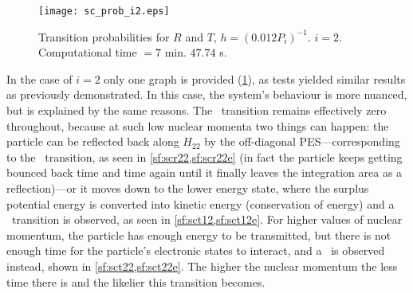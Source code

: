 \begin{figure}
\centering
\texttt{[image: sc\_prob\_i2.eps]}
\caption[Single avoided crossing. $ i = 2 $]{Transition probabilities for $ R $ and $ T $, $ h = (0.012P_{i})^{-1} $. $ i = 2 $. Computational time $ = 7$ min. $ 47.74 $ s.}
\label{f:sci2}
\end{figure}
In the case of $ i = 2 $ only one graph is provided (\cref{f:sci2}), as tests yielded similar results as previously demonstrated. In this case, the system's behaviour is more nuanced, but is explained by the same reasons. The \rot~transition remains effectively zero throughout, because at such low nuclear momenta two things can happen: the particle can be reflected back along $ H_{22} $ by the off-diagonal PES---corresponding to the \rtt~transition, as seen in \cref{sf:scr22,sf:scr22e} (in fact the particle keeps getting bounced back time and time again until it finally leaves the integration area as a reflection)---or it moves down to the lower energy state, where the surplus potential energy is converted into kinetic energy (conservation of energy) and a \tot~transition is observed, as seen in \cref{sf:sct12,sf:sct12e}. For higher values of nuclear momentum, the particle has enough energy to be transmitted, but there is not enough time for the particle's electronic states to interact, and a \ttt~is observed instead, shown in \cref{sf:sct22,sf:sct22e}. The higher the nuclear momentum the less time there is and the likelier this transition becomes.


